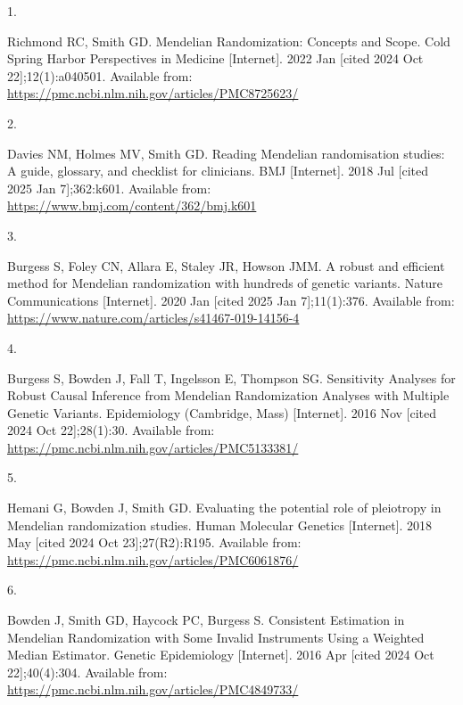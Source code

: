 \documentclass[
]{article}
\newlength{\cslhangindent}
\newlength{\csllabelwidth}
\newenvironment{CSLReferences}[2] %
 {\begin{list}{}{%
  \setlength{\itemindent}{0pt}
  \setlength{\leftmargin}{0pt}
  \setlength{\parsep}{0pt}
  \ifodd #1
   \setlength{\leftmargin}{\cslhangindent}
   \setlength{\itemindent}{-1\cslhangindent}
  \fi
  \setlength{\itemsep}{#2\baselineskip}}}
 {\end{list}}
\newcommand{\CSLLeftMargin}[1]{\parbox[t]{\csllabelwidth}{\strut#1\strut}}
\newcommand{\CSLRightInline}[1]{\parbox[t]{\linewidth - \csllabelwidth}{\strut#1\strut}}
\begin{document}
\label{refs}
\begin{CSLReferences}{0}{1}
\CSLLeftMargin{1. }%
\CSLRightInline{Richmond RC, Smith GD. Mendelian {Randomization}: {Concepts} and {Scope}. Cold Spring Harbor Perspectives in Medicine {[}Internet{]}. 2022 Jan {[}cited 2024 Oct 22{]};12(1):a040501. Available from: \url{https://pmc.ncbi.nlm.nih.gov/articles/PMC8725623/}}

\CSLLeftMargin{2. }%
\CSLRightInline{Davies NM, Holmes MV, Smith GD. Reading {Mendelian} randomisation studies: A guide, glossary, and checklist for clinicians. BMJ {[}Internet{]}. 2018 Jul {[}cited 2025 Jan 7{]};362:k601. Available from: \url{https://www.bmj.com/content/362/bmj.k601}}

\CSLLeftMargin{3. }%
\CSLRightInline{Burgess S, Foley CN, Allara E, Staley JR, Howson JMM. A robust and efficient method for {Mendelian} randomization with hundreds of genetic variants. Nature Communications {[}Internet{]}. 2020 Jan {[}cited 2025 Jan 7{]};11(1):376. Available from: \url{https://www.nature.com/articles/s41467-019-14156-4}}

\CSLLeftMargin{4. }%
\CSLRightInline{Burgess S, Bowden J, Fall T, Ingelsson E, Thompson SG. Sensitivity {Analyses} for {Robust} {Causal} {Inference} from {Mendelian} {Randomization} {Analyses} with {Multiple} {Genetic} {Variants}. Epidemiology (Cambridge, Mass) {[}Internet{]}. 2016 Nov {[}cited 2024 Oct 22{]};28(1):30. Available from: \url{https://pmc.ncbi.nlm.nih.gov/articles/PMC5133381/}}

\CSLLeftMargin{5. }%
\CSLRightInline{Hemani G, Bowden J, Smith GD. Evaluating the potential role of pleiotropy in {Mendelian} randomization studies. Human Molecular Genetics {[}Internet{]}. 2018 May {[}cited 2024 Oct 23{]};27(R2):R195. Available from: \url{https://pmc.ncbi.nlm.nih.gov/articles/PMC6061876/}}

\CSLLeftMargin{6. }%
\CSLRightInline{Bowden J, Smith GD, Haycock PC, Burgess S. Consistent {Estimation} in {Mendelian} {Randomization} with {Some} {Invalid} {Instruments} {Using} a {Weighted} {Median} {Estimator}. Genetic Epidemiology {[}Internet{]}. 2016 Apr {[}cited 2024 Oct 22{]};40(4):304. Available from: \url{https://pmc.ncbi.nlm.nih.gov/articles/PMC4849733/}}

\end{CSLReferences}
\end{document}
